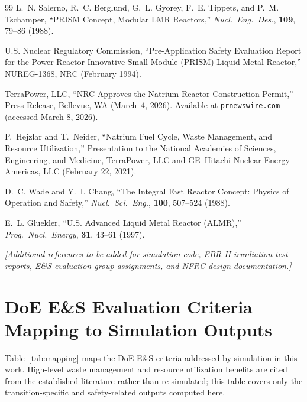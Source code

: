 \documentclass[10pt,twoside]{article}
\newcommand{\placeholder}[1]{%
  \textcolor{placeholder}{\textit{[#1]}}}
\begin{document}
\begin{thebibliography}{99}
L.~N. Salerno, R.~C. Berglund, G.~L. Gyorey, F.~E. Tippets, and
P.~M. Tschamper,
``PRISM Concept, Modular LMR Reactors,''
\textit{Nucl.\ Eng.\ Des.}, \textbf{109}, 79--86 (1988).

U.S. Nuclear Regulatory Commission,
``Pre-Application Safety Evaluation Report for the Power Reactor
Innovative Small Module (PRISM) Liquid-Metal Reactor,''
NUREG-1368, NRC (February 1994).

TerraPower, LLC,
``NRC Approves the Natrium Reactor Construction Permit,''
Press Release, Bellevue, WA (March~4, 2026).
Available at \texttt{prnewswire.com} (accessed March 8, 2026).

P.~Hejzlar and T.~Neider,
``Natrium Fuel Cycle, Waste Management, and Resource Utilization,''
Presentation to the National Academies of Sciences, Engineering, and
Medicine, TerraPower, LLC and GE~Hitachi Nuclear Energy Americas, LLC
(February 22, 2021).

D.~C. Wade and Y.~I. Chang,
``The Integral Fast Reactor Concept: Physics of Operation and Safety,''
\textit{Nucl.\ Sci.\ Eng.}, \textbf{100}, 507--524 (1988).

E.~L. Gluekler,
``U.S. Advanced Liquid Metal Reactor (ALMR),''
\textit{Prog.\ Nucl.\ Energy}, \textbf{31}, 43--61 (1997).

\placeholder{Additional references to be added for simulation code,
  EBR-II irradiation test reports, E\&S evaluation group assignments,
  and NFRC design documentation.}

\end{thebibliography}
\endgroup

\appendix
\section{DoE E\&S Evaluation Criteria Mapping to Simulation Outputs}

Table~\ref{tab:mapping} maps the DoE E\&S criteria addressed by
simulation in this work.  High-level waste management and resource
utilization benefits are cited from the established literature rather
than re-simulated; this table covers only the transition-specific
and safety-related outputs computed here.
\end{document}
